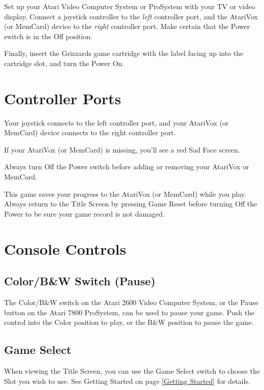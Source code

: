 \documentclass[10pt,twoside,openright]{memoir}
\begin{document}
Set up  your Atari Video  Computer System or  ProSystem with your  TV or
video  display.  Connect  a   joystick  controller  to  the  \emph{left}
controller  port,   and  the  AtariVox   (or  MemCard)  device   to  the
\emph{right} controller port.  Make certain that the Power  switch is in
the Off position.

Finally, insert the Grizzards game cartridge with the
label facing up into the cartridge slot, and turn the Power On.

\section{Controller Ports}

Your joystick  connects to the  left controller port, and  your AtariVox
(or MemCard) device connects to the right controller port.

If  your  AtariVox  (or  MemCard)  is missing,  you'll  see  a  red  Sad
Face screen.

Always   turn  Off   the  Power   switch  before   adding  or   removing
your AtariVox or MemCard.

This game  saves your progress  to the  AtariVox (or MemCard)  while you
play. Always  return to the Title  Screen by pressing Game  Reset before
turning Off the Power to be sure your game record is not damaged.

\section{Console Controls}

\subsection{Color/B\&W Switch (Pause)}

The Color/B\&W switch on the Atari  2600 Video Computer System, or the
Pause button  on the Atari 7800  ProSystem, can be used  to pause your
game. Push  the control into the  Color position to play,  or the B\&W
position to pause the game.

\subsection{Game Select}

When viewing the Title Screen, you can use the Game Select switch to
choose the Slot you wish to use.  See Getting Started on page
\ref{Getting Started} for details.
\end{document}
